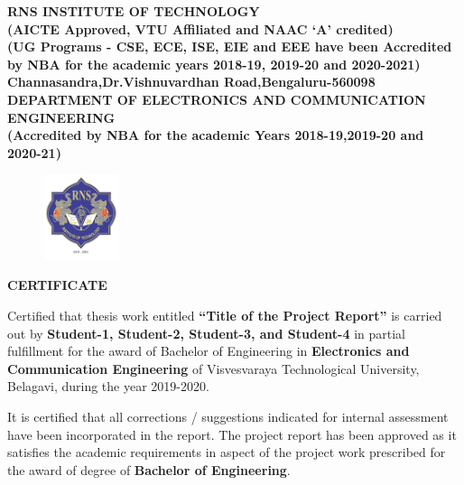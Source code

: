 \setlength{\toptafiddle}{1in}
\setlength{\bottafiddle}{1in}
\vspace*{-0.5in}
\enlargethispage{\bottafiddle}
\thispagestyle{empty}


\begin{center}
\small\textbf{	RNS INSTITUTE OF TECHNOLOGY\\
(AICTE Approved, VTU Affiliated and NAAC `A' credited)\\
(UG Programs - CSE, ECE, ISE, EIE and EEE have been Accredited by NBA for the academic years 2018-19, 2019-20 and 2020-2021)\\
Channasandra,Dr.Vishnuvardhan Road,Bengaluru-560098}\\
\vspace{0.3cm}
\scriptsize\textbf{DEPARTMENT OF ELECTRONICS AND COMMUNICATION ENGINEERING}\\
\small\textbf{(Accredited by NBA for the academic Years 2018-19,2019-20 and 2020-21)
}
\end{center}

\begin{center}
\begin{figure}[h]
\centering
\includegraphics[height=2.5cm]{images/rns1.jpg}
\end{figure}
\Large{\textbf{CERTIFICATE}}
\end{center}

Certified that thesis work entitled \textbf{``Title of the Project Report''} is carried out by \textbf{Student-1, Student-2, Student-3, and Student-4} in partial fulfillment for the award of Bachelor of Engineering in \textbf{\color{blue}Electronics and Communication Engineering} of Visvesvaraya Technological University, Belagavi, during the year 2019-2020. 


It is certified that all corrections / suggestions indicated for internal assessment have been incorporated in the report. The project report has been approved as it satisfies the academic requirements in aspect of the project work prescribed for the award of degree of \textbf{\color{blue}Bachelor of Engineering}.

